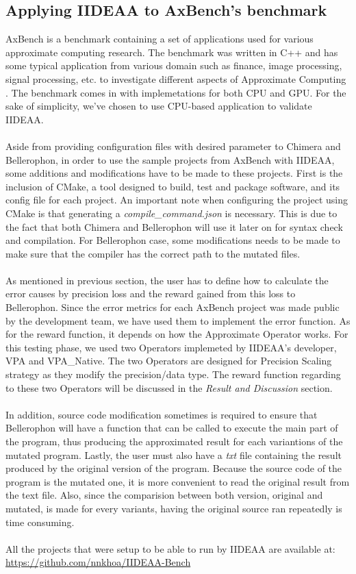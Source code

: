 \subsection{Applying IIDEAA to AxBench's benchmark}

AxBench is a benchmark containing a set of applications used for various approximate computing research. The benchmark was written in C++ and has some typical application from various domain such as finance, image processing, signal processing, etc. to investigate different aspects of Approximate Computing \cite{7755728}. The benchmark comes in with implemetations for both CPU and GPU. For the sake of simplicity, we've chosen to use CPU-based application to validate IIDEAA. \\
~\\
Aside from providing configuration files with desired parameter to Chimera and Bellerophon, in order to use the sample projects from AxBench with IIDEAA, some additions and modifications have to be made to these projects. First is the inclusion of CMake, a tool designed to build, test and package software, and its config file for each project. An important note when configuring the project using CMake is that generating a \textit{compile\_command.json} is necessary. This is due to the fact that both Chimera and Bellerophon will use it later on for syntax check and compilation. For Bellerophon case, some modifications needs to be made to make sure that the compiler has the correct path to the mutated files. \\
~\\
As mentioned in previous section, the user has to define how to calculate the error causes by precision loss and the reward gained from this loss to Bellerophon. Since the error metrics for each AxBench project was made public by the development team, we have used them to implement the error function. As for the reward function, it depends on how the Approximate Operator works. For this testing phase, we used two Operators implemeted by IIDEAA's developer, VPA and VPA\_Native. The two Operators are designed for Precision Scaling strategy as they modify the precision/data type. The reward function regarding to these two Operators will be discussed in the \textit{Result and Discussion} section. \\
~\\
In addition, source code modification sometimes is required to ensure that Bellerophon will have a function that can be called to execute the main part of the program, thus producing the approximated result for each variantions of the mutated program. Lastly, the user must also have a \textit{txt} file containing the result produced by the original version of the program. Because the source code of the program is the mutated one, it is more convenient to read the original result from the text file. Also, since the comparision between both version, original and mutated, is made for every variants, having the original source ran repeatedly is time consuming. \\
~\\
All the projects that were setup to be able to run by IIDEAA are available at: \url{https://github.com/nnkhoa/IIDEAA-Bench} \\

